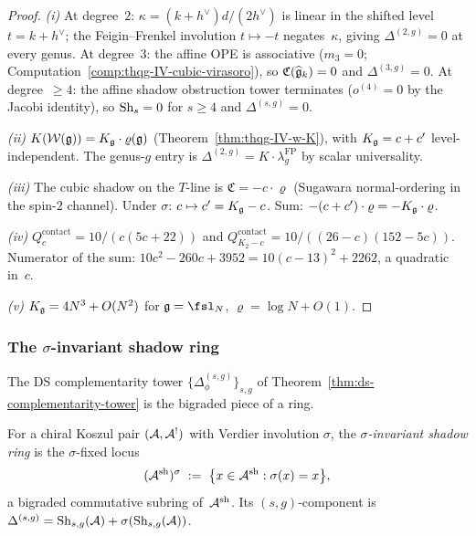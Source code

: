 \begin{proof}
\emph{(i)}
At degree~$2$: $\kappa = (k{+}h^\vee)d/(2h^\vee)$ is linear in the
shifted level $t = k + h^\vee$; the Feigin--Frenkel involution
$t \mapsto -t$ negates~$\kappa$, giving $\Delta^{(2,g)} = 0$
at every genus.
At degree~$3$: the affine OPE is associative
($m_3 = 0$; Computation~\ref{comp:thqg-IV-cubic-virasoro}), so
$\mathfrak{C}(\widehat{\mathfrak{g}}_k) = 0$ and
$\Delta^{(3,g)} = 0$.
At degree~$\geq 4$: the affine shadow obstruction tower terminates
($o^{(4)} = 0$ by the Jacobi identity), so $\mathrm{Sh}_s = 0$ for $s \geq 4$
and $\Delta^{(s,g)} = 0$.

\emph{(ii)}
$K(\mathcal{W}(\mathfrak{g})) = K_{\mathfrak{g}} \cdot \varrho(\mathfrak{g})$
(Theorem~\ref{thm:thqg-IV-w-K}), with
$K_{\mathfrak{g}} = c + c'$ level-independent.
The genus-$g$ entry is
$\Delta^{(2,g)} = K \cdot \lambda_g^{\mathrm{FP}}$
by scalar universality.

\emph{(iii)}
The cubic shadow on the $T$-line is
$\mathfrak{C} = -c \cdot \varrho$
(Sugawara normal-ordering in the spin-$2$ channel).
Under $\sigma$: $c \mapsto c' = K_{\mathfrak{g}} - c$.
Sum: $-(c + c') \cdot \varrho = -K_{\mathfrak{g}} \cdot \varrho$.

\emph{(iv)}
$Q^{\mathrm{contact}}_c = 10/(c(5c+22))$
and $Q^{\mathrm{contact}}_{K_2 - c} = 10/((26-c)(152-5c))$.
Numerator of the sum: $10c^2 - 260c + 3952 = 10(c-13)^2 + 2262$,
a quadratic in~$c$.

\emph{(v)}
$K_{\mathfrak{g}} = 4N^3 + O(N^2)$ for $\fg = \fsl_N$,
$\varrho = \log N + O(1)$.
\end{proof}

%
%

\subsubsection{The $\sigma$-invariant shadow ring}
\label{subsec:thqg-IV-sigma-ring}

The DS complementarity tower
$\{\Delta_\phi^{(s,g)}\}_{s,g}$ of
Theorem~\ref{thm:ds-complementarity-tower} is the bigraded piece
of a ring.

\begin{definition}
\label{def:sigma-invariant-shadow-ring}
For a chiral Koszul pair $(\mathcal{A}, \mathcal{A}^!)$ with Verdier involution
$\sigma$, the \emph{$\sigma$-invariant shadow ring} is the
$\sigma$-fixed locus
\begin{equation}\label{eq:sigma-ring-def}
(\mathcal{A}^{\mathrm{sh}})^\sigma
\;:=\;
\bigl\{x \in \mathcal{A}^{\mathrm{sh}} : \sigma(x) = x\bigr\},
\end{equation}
a bigraded commutative subring of~$\mathcal{A}^{\mathrm{sh}}$.
Its $(s,g)$-component is $\Delta^{(s,g)}
= \mathrm{Sh}_{s,g}(\mathcal{A}) + \sigma(\mathrm{Sh}_{s,g}(\mathcal{A}))$.
\end{definition}

